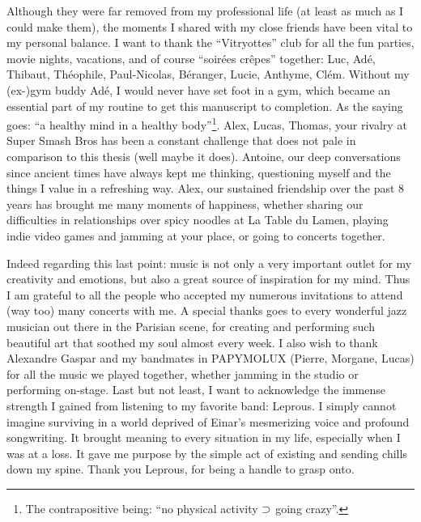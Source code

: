 Although they were far removed from my professional life (at least as much as I could make them), the moments I shared with my close friends have been vital to my personal balance. I want to thank the ``Vitryottes'' club for all the fun parties, movie nights, vacations, and of course ``soirées crêpes'' together: Luc, Adé, Thibaut, Théophile, Paul-Nicolas, Béranger, Lucie, Anthyme, Clém. Without my (ex-)gym buddy Adé, I would never have set foot in a gym, which became an essential part of my routine to get this manuscript to completion. As the saying goes: ``a healthy mind in a healthy body''\footnote{The contrapositive being: ``no physical activity $\supset$ going crazy''.}. Alex, Lucas, Thomas, your rivalry at Super Smash Bros has been a constant challenge that does not pale in comparison to this thesis (well maybe it does). Antoine, our deep conversations since ancient times have always kept me thinking, questioning myself and the things I value in a refreshing way. Alex, our sustained friendship over the past 8 years has brought me many moments of happiness, whether sharing our difficulties in relationships over spicy noodles at La Table du Lamen, playing indie video games and jamming at your place, or going to concerts together.

Indeed regarding this last point: music is not only a very important outlet for my creativity and emotions, but also a great source of inspiration for my mind. Thus I am grateful to all the people who accepted my numerous invitations to attend (way too) many concerts with me. A special thanks goes to every wonderful jazz musician out there in the Parisian scene, for creating and performing such beautiful art that soothed my soul almost every week. I also wish to thank Alexandre Gaspar and my bandmates in PAPYMOLUX (Pierre, Morgane, Lucas) for all the music we played together, whether jamming in the studio or performing on-stage. Last but not least, I want to acknowledge the immense strength I gained from listening to my favorite band: Leprous. I simply cannot imagine surviving in a world deprived of Einar's mesmerizing voice and profound songwriting. It brought meaning to every situation in my life, especially when I was at a loss. It gave me purpose by the simple act of existing and sending chills down my spine. Thank you Leprous, for being a handle to grasp onto.

